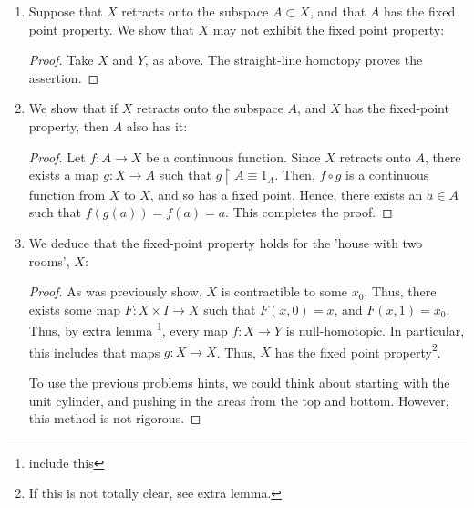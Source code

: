 \documentclass{book}
\begin{document}
\begin{enumerate}[(1)]
    \item Suppose that $X$ retracts onto the subspace $A \subset X$, and that $A$ has the fixed point property. We show that $X$ may not exhibit the fixed point property: 
        \begin{proof} Take $X$ and $Y$, as above. The straight-line homotopy proves the assertion. 
        \end{proof}


    \item We show that if $X$ retracts onto the subspace $A$, and $X$ has the fixed-point property, then $A$ also has it: 
        \begin{proof} Let $f:A\rightarrow X$ be a continuous function. Since $X$ retracts onto $A$, there exists a map $g:X\rightarrow A$ such that $g \restriction{A} \equiv 1_A$. Then, $f \circ g$ is a continuous function from $X$ to $X$, and so has a fixed point. Hence, there exists an $a\in A$ such that $f(g(a))=f(a)=a$. This completes the proof. 
        \end{proof}

    \item We deduce that the fixed-point property holds for the 'house with two rooms', $X$: 
        \begin{proof} As was previously show, $X$ is contractible to some $x_0$. Thus, there exists some map $F: X \times I \rightarrow X$ such that $F(x,0) = x$, and $F(x,1) = x_0$. Thus, by extra lemma \footnote{include this}, every map $f:X \rightarrow Y$ is null-homotopic. In particular, this includes that maps $g: X \rightarrow X$. Thus, $X$ has the fixed point property\footnote{If this is not totally clear, see extra lemma.}. 
            \par To use the previous problems hints, we could think about starting with the unit cylinder, and pushing in the areas from the top and bottom. However, this method is not rigorous. 
        \end{proof}


\end{enumerate}
\end{document}
